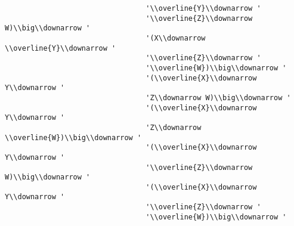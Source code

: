 \begin{verbatim}
                                 '\\overline{Y}\\downarrow '
                                 '\\overline{Z}\\downarrow W)\\big\\downarrow '
                                 '(X\\downarrow \\overline{Y}\\downarrow '
                                 '\\overline{Z}\\downarrow '
                                 '\\overline{W})\\big\\downarrow '
                                 '(\\overline{X}\\downarrow Y\\downarrow '
                                 'Z\\downarrow W)\\big\\downarrow '
                                 '(\\overline{X}\\downarrow Y\\downarrow '
                                 'Z\\downarrow \\overline{W})\\big\\downarrow '
                                 '(\\overline{X}\\downarrow Y\\downarrow '
                                 '\\overline{Z}\\downarrow W)\\big\\downarrow '
                                 '(\\overline{X}\\downarrow Y\\downarrow '
                                 '\\overline{Z}\\downarrow '
                                 '\\overline{W})\\big\\downarrow '

\end{verbatim}
